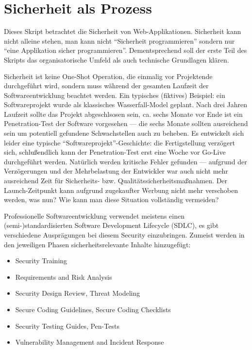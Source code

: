 \chapter{Sicherheit als Prozess}

Dieses Skript betrachtet die Sicherheit von Web-Applikationen. Sicherheit kann nicht alleine stehen, man kann nicht ``Sicherheit programmieren'' sondern nur ``eine Applikation sicher programmieren''. Dementsprechend soll der erste Teil des Skripts das organisatorische Umfeld als auch technische Grundlagen klären.

Sicherheit ist keine One-Shot Operation, die einmalig vor Projektende durchgeführt wird, sondern muss während der gesamten Laufzeit der Softwareentwicklung beachtet werden. Ein typisches (fiktives) Beispiel: ein Softwareprojekt wurde als klassisches Wasserfall-Model geplant. Nach drei Jahren Laufzeit sollte das Projekt abgeschlsosen sein, ca. sechs Monate vor Ende ist ein Penetration-Test der Software vorgesehen --- die sechs Monate sollten ausreichend sein um potentiell gefundene Schwachstellen auch zu beheben. Es entwickelt sich leider eine typische ``Softwareprojekt''-Geschichte: die Fertigstellung verzögert sich, schlußendlich kann der Penetration-Test erst eine Woche vor Go-Live durchgeführt werden. Natürlich werden kritische Fehler gefunden --- aufgrund der Verzögerungen und der Mehrbelastung der Entwickler war auch nicht mehr ausreichend Zeit für Sicherheits- bzw. Qualitätssicherheitsmaßnahmen. Der Launch-Zeitpunkt kann aufgrund zugekaufter Werbung nicht mehr verschoben werden, was nun? Wie kann man diese Situation vollständig vermeiden?

Professionelle Softwareentwicklung verwendet meistens einen (semi-)standardisierten Software Development Lifecycle (SDLC), es gibt verschiedene Ausprägungen bei diesem Security einzubringen. Zumeist werden in den jeweiligen Phasen sicherheitsrelevante Inhalte hinzugefügt:

\begin{itemize}
	\item Security Training
	\item Requirements and Risk Analysis
	\item Security Design Review, Threat Modeling
	\item Secure Coding Guidelines, Secure Coding Checklists
	\item Security Testing Guides, Pen-Tests
	\item Vulnerability Management and Incident Response
\end{itemize}

